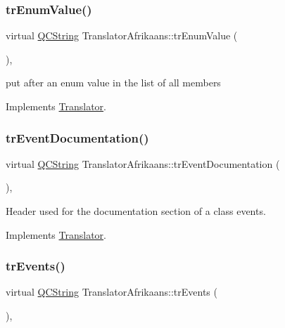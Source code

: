 \subsubsection{\texorpdfstring{trEnumValue()}{trEnumValue()}}
{\footnotesize\ttfamily virtual \mbox{\hyperlink{class_q_c_string}{Q\+C\+String}} Translator\+Afrikaans\+::tr\+Enum\+Value (\begin{DoxyParamCaption}{ }\end{DoxyParamCaption})\hspace{0.3cm}{\ttfamily [inline]}, {\ttfamily [virtual]}}

put after an enum value in the list of all members 

Implements \mbox{\hyperlink{class_translator}{Translator}}.

\mbox{\label{class_translator_afrikaans_a87c84c2561389783a83b451c714599fa}} 
\subsubsection{\texorpdfstring{trEventDocumentation()}{trEventDocumentation()}}
{\footnotesize\ttfamily virtual \mbox{\hyperlink{class_q_c_string}{Q\+C\+String}} Translator\+Afrikaans\+::tr\+Event\+Documentation (\begin{DoxyParamCaption}{ }\end{DoxyParamCaption})\hspace{0.3cm}{\ttfamily [inline]}, {\ttfamily [virtual]}}

Header used for the documentation section of a class\textquotesingle{} events. 

Implements \mbox{\hyperlink{class_translator}{Translator}}.

\mbox{\label{class_translator_afrikaans_aea1cf7b4d33588cc73ca6c3c61225998}} 
\subsubsection{\texorpdfstring{trEvents()}{trEvents()}}
{\footnotesize\ttfamily virtual \mbox{\hyperlink{class_q_c_string}{Q\+C\+String}} Translator\+Afrikaans\+::tr\+Events (\begin{DoxyParamCaption}{ }\end{DoxyParamCaption})\hspace{0.3cm}{\ttfamily [inline]}, {\ttfamily [virtual]}}

